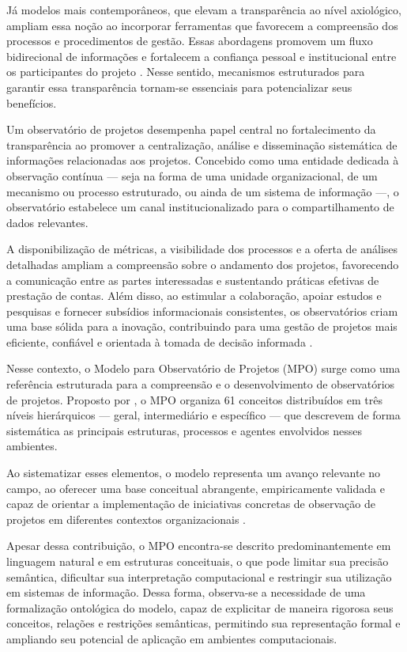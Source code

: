 Já modelos mais contemporâneos, que elevam a transparência ao nível axiológico, ampliam essa noção ao incorporar ferramentas que favorecem a compreensão dos processos e procedimentos de gestão. Essas abordagens promovem um fluxo bidirecional de informações e fortalecem a confiança pessoal e institucional entre os participantes do projeto \cite{betta2018transparency}. Nesse sentido, mecanismos estruturados para garantir essa transparência tornam-se essenciais para potencializar seus benefícios.

Um observatório de projetos desempenha papel central no fortalecimento da transparência ao promover a centralização, análise e disseminação sistemática de informações relacionadas aos projetos. Concebido como uma entidade dedicada à observação contínua — seja na forma de uma unidade organizacional, de um mecanismo ou processo estruturado, ou ainda de um sistema de informação —, o observatório estabelece um canal institucionalizado para o compartilhamento de dados relevantes.

A disponibilização de métricas, a visibilidade dos processos e a oferta de análises detalhadas ampliam a compreensão sobre o andamento dos projetos, favorecendo a comunicação entre as partes interessadas e sustentando práticas efetivas de prestação de contas. Além disso, ao estimular a colaboração, apoiar estudos e pesquisas e fornecer subsídios informacionais consistentes, os observatórios criam uma base sólida para a inovação, contribuindo para uma gestão de projetos mais eficiente, confiável e orientada à tomada de decisão informada \cite{vieira2021model}.

Nesse contexto, o Modelo para Observatório de Projetos (MPO) surge como uma referência estruturada para a compreensão e o desenvolvimento de observatórios de projetos. Proposto por \citeauthor{vieira2022thesis}, o MPO organiza 61 conceitos distribuídos em três níveis hierárquicos — geral, intermediário e específico — que descrevem de forma sistemática as principais estruturas, processos e agentes envolvidos nesses ambientes.

Ao sistematizar esses elementos, o modelo representa um avanço relevante no campo, ao oferecer uma base conceitual abrangente, empiricamente validada e capaz de orientar a implementação de iniciativas concretas de observação de projetos em diferentes contextos organizacionais \cite{vieira2022thesis}. 

Apesar dessa contribuição, o MPO encontra-se descrito predominantemente em linguagem natural e em estruturas conceituais, o que pode limitar sua precisão semântica, dificultar sua interpretação computacional e restringir sua utilização em sistemas de informação. Dessa forma, observa-se a necessidade de uma formalização ontológica do modelo, capaz de explicitar de maneira rigorosa seus conceitos, relações e restrições semânticas, permitindo sua representação formal e ampliando seu potencial de aplicação em ambientes computacionais.

